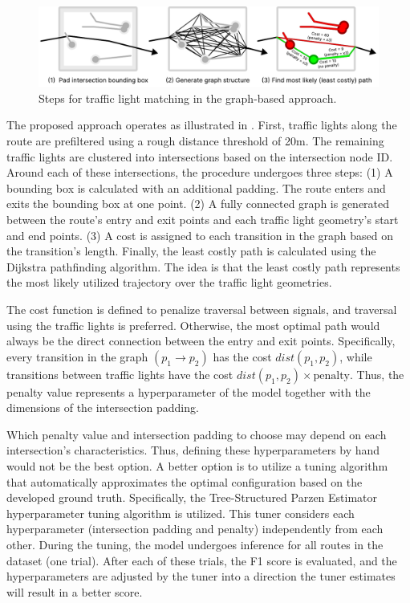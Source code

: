\begin{figure}[t]
\centering
\includegraphics[width=\linewidth]{images/sg-selection-graph-approach.pdf}
\caption{Steps for traffic light matching in the graph-based approach.}
\label{fig:sg-selection-graph-approach}
\end{figure}

The proposed approach operates as illustrated in . First, traffic lights along the route are prefiltered using a rough distance threshold of 20m. The remaining traffic lights are clustered into intersections based on the intersection node ID. Around each of these intersections, the procedure undergoes three steps: (1) A bounding box is calculated with an additional padding. The route enters and exits the bounding box at one point. (2) A fully connected graph is generated between the route's entry and exit points and each traffic light geometry's start and end points. (3) A cost is assigned to each transition in the graph based on the transition's length. Finally, the least costly path is calculated using the Dijkstra pathfinding algorithm. The idea is that the least costly path represents the most likely utilized trajectory over the traffic light geometries.

The cost function is defined to penalize traversal between signals, and traversal using the traffic lights is preferred. Otherwise, the most optimal path would always be the direct connection between the entry and exit points. Specifically, every transition in the graph  $(p_{1} \rightarrow p_{2})$ has the cost $dist(p_{1}, p_{2})$, while transitions between traffic lights have the cost $dist(p_{1}, p_{2}) \times \text{penalty}$. Thus, the penalty value represents a hyperparameter of the model together with the dimensions of the intersection padding. 

Which penalty value and intersection padding to choose may depend on each intersection's characteristics. Thus, defining these hyperparameters by hand would not be the best option. A better option is to utilize a tuning algorithm that automatically approximates the optimal configuration based on the developed ground truth. Specifically, the Tree-Structured Parzen Estimator hyperparameter tuning algorithm \cite{ozaki_multiobjective_2020} is utilized. This tuner considers each hyperparameter (intersection padding and penalty) independently from each other. During the tuning, the model undergoes inference for all routes in the dataset (one trial). After each of these trials, the F1 score is evaluated, and the hyperparameters are adjusted by the tuner into a direction the tuner estimates will result in a better score.

